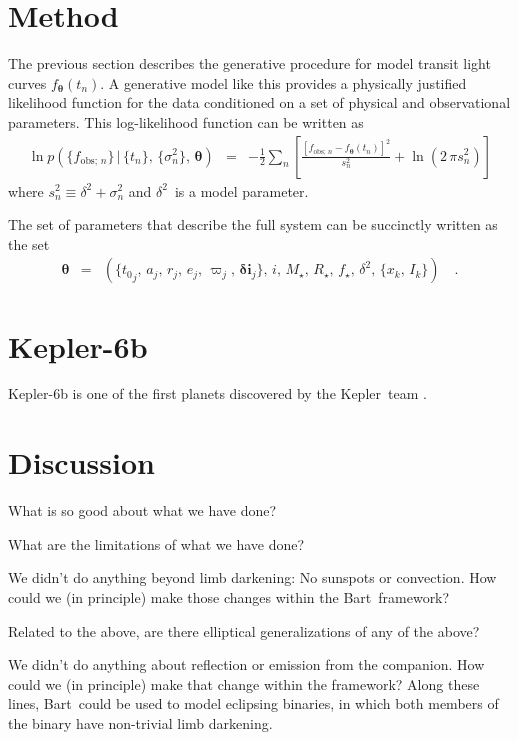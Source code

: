 \documentclass[12pt,preprint]{aastex}
\newcommand{\project}[1]{{\sffamily #1}}
\newcommand{\bart}{\project{Bart}}
\newcommand{\kepler}{\project{Kepler}}
\newcommand{\bvec}[1]{\ensuremath{\boldsymbol{#1}}}
\newcommand{\pr}[1]{\ensuremath{p (#1)}}
\newcommand{\setof}[1]{\ensuremath{\{ #1 \}}}
\newcommand{\model}{\ensuremath{\bvec{\theta}}}
\newcommand{\tobs}{\ensuremath{t_n}}
\newcommand{\fmodel}{\ensuremath{f_{\model} (\tobs)}}
\newcommand{\fobs}{\ensuremath{f_{\mathrm{obs};\,n}}}
\newcommand{\ferr}{\ensuremath{\sigma_n^2}}
\newcommand{\fullerr}{\ensuremath{s_n^2}}
\newcommand{\rstar}{\ensuremath{R_\star}}
\newcommand{\rplanet}{\ensuremath{r}}
\newcommand{\rsurface}{\ensuremath{x}}
\newcommand{\tzero}{\ensuremath{{t_0}}}
\newcommand{\smaxis}{\ensuremath{a}}
\newcommand{\ecc}{\ensuremath{e}}
\newcommand{\pomega}{\ensuremath{\varpi}}
\newcommand{\incl}{\ensuremath{\bvec{\delta i}}}
\newcommand{\jitter}{\ensuremath{\delta^2}}
\newcommand{\mstar}{\ensuremath{M_\star}}
\newcommand{\fstar}{\ensuremath{f_\star}}
\newcommand{\iobs}{\ensuremath{i}}
\begin{document}
\section{Method}

The previous section describes the generative procedure for model transit
light curves \fmodel.
A generative model like this provides a physically justified likelihood
function for the data conditioned on a set of physical and observational
parameters.
This log-likelihood function can be written as
\begin{eqnarray}
    \ln \pr{\setof{\fobs}\,|\,\setof{\tobs},\,\setof{\ferr},\,\model}
    & = & -\frac{1}{2} \sum_{n} \left [ \frac{[\fobs - \fmodel]^2}{\fullerr}
+ \ln \left ( 2\,\pi\fullerr \right ) \right ]
\end{eqnarray}
where $\fullerr \equiv \jitter + \ferr$ and \jitter\ is a model parameter.

The set of parameters that describe the full system can be succinctly written
as the set
\begin{eqnarray}
    \model & = & \left (
        \setof{\tzero_j,\,\smaxis_j,\,\rplanet_j,\,\ecc_j,\,\pomega_j,\,
        \incl_j},\,\iobs,\,\mstar,\,\rstar,\,\fstar,\,\jitter,\,
        \setof{\rsurface_k,\,I_k}
    \right ) \quad.
\end{eqnarray}


\section{Kepler-6b}

Kepler-6b is one of the first planets discovered by the \kepler\ team
\citep{kepler6b}.


\section{Discussion}

What is so good about what we have done?

What are the limitations of what we have done?

We didn't do anything beyond limb darkening:  No sunspots or convection.
How could we (in principle) make those changes within the \bart\ framework?

Related to the above, are there elliptical generalizations of any of the above?

We didn't do anything about reflection or emission from the companion.
How could we (in principle) make that change within the framework?
Along these lines, \bart\ could be used to model eclipsing binaries,
in which both members of the binary have non-trivial limb darkening.
\end{document}

